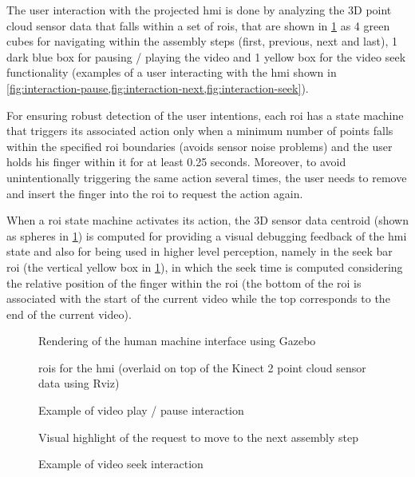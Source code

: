 The user interaction with the projected \gls{hmi} is done by analyzing the 3D point cloud sensor data that falls within a set of \glspl{roi}, that are shown in \cref{fig:interaction-rois} as 4 green cubes for navigating within the assembly steps (first, previous, next and last), 1 dark blue box for pausing / playing the video and 1 yellow box for the video seek functionality (examples of a user interacting with the \gls{hmi} shown in \cref{fig:interaction-pause,fig:interaction-next,fig:interaction-seek}).

For ensuring robust detection of the user intentions, each \gls{roi} has a state machine that triggers its associated action only when a minimum number of points falls within the specified \gls{roi} boundaries (avoids sensor noise problems) and the user holds his finger within it for at least 0.25 seconds. Moreover, to avoid unintentionally triggering the same action several times, the user needs to remove and insert the finger into the \gls{roi} to request the action again.

When a \gls{roi} state machine activates its action, the 3D sensor data centroid (shown as spheres in \cref{fig:interaction-rois}) is computed for providing a visual debugging feedback of the \gls{hmi} state and also for being used in higher level perception, namely in the seek bar \gls{roi} (the vertical yellow box in \cref{fig:interaction-rois}), in which the seek time is computed considering the relative position of the finger within the \gls{roi} (the bottom of the \gls{roi} is associated with the start of the current video while the top corresponds to the end of the current video).

\begin{figure}[H]
	\begin{floatrow}[2]
		{\caption{Rendering of the human machine interface using Gazebo}\label{fig:human-machine-interface}}
		{\caption{\glspl{roi} for the \gls{hmi} (overlaid on top of the Kinect 2 point cloud sensor data using Rviz)}\label{fig:interaction-rois}}
	\end{floatrow}
\end{figure}

\begin{figure}[ht]
	\begin{floatrow}[3]
		{\caption{Example of video play / pause interaction}\label{fig:interaction-pause}}
		{\caption{Visual highlight of the request to move to the next assembly step}\label{fig:interaction-next}}
		{\caption{Example of video seek interaction}\label{fig:interaction-seek}}
	\end{floatrow}
\end{figure}


